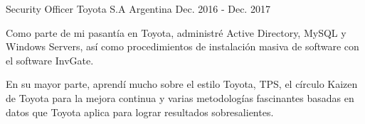 \begin{cventries}


	\cventry
	{Security Officer} %
	{Toyota S.A} %
	{Argentina} %
	{Dec. 2016 - Dec. 2017} %
	{
		\begin{cvitems} %
			\item {Como parte de mi pasantía en Toyota, administré Active Directory, MySQL y Windows Servers, así como procedimientos de instalación masiva de software con el software InvGate.}
			\item {En su mayor parte, aprendí mucho sobre el estilo Toyota, TPS, el círculo Kaizen de Toyota para la mejora continua y varias metodologías fascinantes basadas en datos que Toyota aplica para lograr resultados sobresalientes.}
		\end{cvitems}
	}
\end{cventries}
